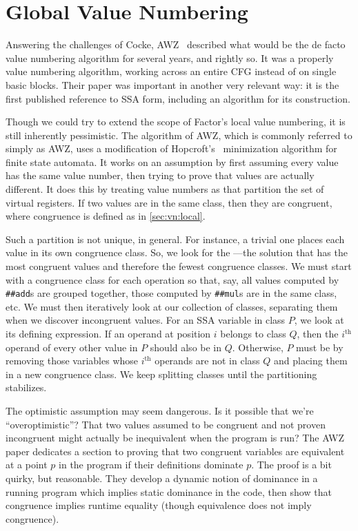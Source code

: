 \section{Global Value Numbering}\label{sec:vn:global}

Answering the challenges of Cocke, AWZ~
described what would be the de facto value numbering algorithm for several
years, and rightly so.  It was a properly  value numbering
algorithm, working across an entire \gls{CFG} instead of on single basic
blocks.  Their paper was important in another very relevant way: it is the
first published reference to SSA form, including an
algorithm for its construction.

Though we could try to extend the scope of Factor's local value numbering, it
is still inherently pessimistic.  The algorithm of AWZ, which
is commonly referred to simply as AWZ, uses a modification of
Hopcroft's~ minimization algorithm for finite state automata.
It works on an  assumption by first assuming every value has
the same value number, then trying to prove that values are actually different.
It does this by treating value numbers as  that
partition the set of virtual registers.  If two values are in the same class,
then they are congruent, where congruence is defined as in \cref{sec:vn:local}.

Such a partition is not unique, in general.  For instance, a trivial one places
each value in its own congruence class.  So, we look for the ---the solution that has the most congruent values and therefore
the fewest congruence classes.  We must start with a congruence class for each
operation so that, say, all values computed by \Verb|##add|s are grouped
together, those computed by \Verb|##mul|s are in the same class, etc.  We
must then iteratively look at our collection of classes, separating them when
we discover incongruent values.  For an \gls{SSA} variable in class $P$, we
look at its defining expression.  If an operand at position $i$ belongs to
class $Q$, then the $i^\text{th}$ operand of every other value in $P$ should
also be in $Q$.  Otherwise, $P$ must be  by removing those
variables whose $i^\text{th}$ operands are not in class $Q$ and placing them in
a new congruence class.  We keep splitting classes until the partitioning
stabilizes.

The optimistic assumption may seem dangerous.  Is it possible that we're
``overoptimistic''?  That two values assumed to be congruent and not proven
incongruent might actually be inequivalent when the program is run?  The
AWZ~ paper dedicates a section to proving that two congruent
variables are equivalent at a point $p$ in the program if their definitions
dominate $p$.  The proof is a bit quirky, but reasonable.  They develop a
dynamic notion of dominance in a running program which implies static dominance
in the code, then show that congruence implies runtime equality (though
equivalence does not imply congruence).

